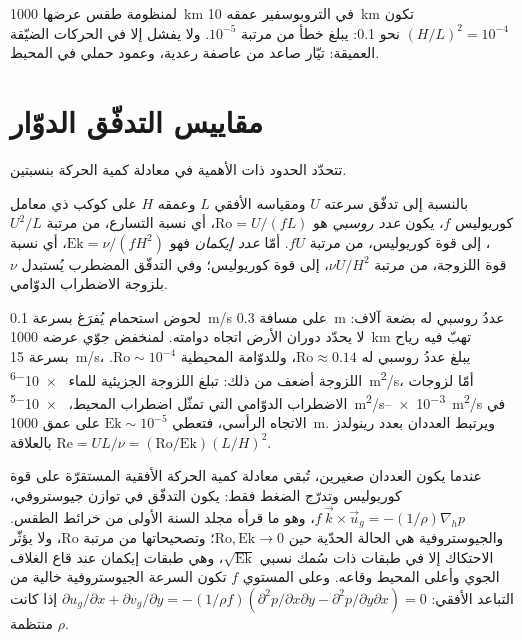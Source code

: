 لمنظومة طقس عرضها \qty{1000}{km} في التروبوسفير عمقه \qty{10}{km}
تكون $(H/L)^2 = 10^{-4}$  نحو 0.1: يبلغ
خطأ  من مرتبة $10^{-5}$. ولا يفشل إلا في الحركات الضيّقة العميقة:
تيّار صاعد من عاصفة رعدية، وعمود حملي في المحيط.

\section{مقاييس التدفّق الدوّار}\label{sec:b3:gfd-foundations:scales}

تتحدّد الحدود ذات الأهمية في معادلة كمية الحركة بنسبتين.

\begin{definition}\label{def:b3:gfd-foundations:numbers}
بالنسبة إلى تدفّق سرعته $U$ ومقياسه الأفقي $L$ وعمقه $H$ على كوكب ذي
معامل كوريوليس $f$، يكون \emph{عدد روسبي} هو
$\mathrm{Ro} = U/(fL)$، أي نسبة التسارع، من مرتبة $U^2/L$،
إلى قوة كوريوليس، من مرتبة $fU$. أمّا \emph{عدد إيكمان}
فهو $\mathrm{Ek} = \nu/(fH^2)$، أي نسبة
قوة اللزوجة، من مرتبة $\nu U/H^2$، إلى قوة كوريوليس؛ وفي
التدفّق المضطرب يُستبدل $\nu$ بلزوجة الاضطراب الدوّامي.
\end{definition}

لحوض استحمام يُفرَغ بسرعة \qty{0.1}{m/s} على مسافة \qty{0.3}{m} عددُ روسبي له
بضعة آلاف: لا يحدّد دوران الأرض اتجاه دوامته.
لمنخفض جوّي عرضه \qty{1000}{km} تهبّ فيه رياح بسرعة \qty{15}{m/s}،
يبلغ عددُ روسبي له $\mathrm{Ro} \approx 0.14$، وللدوّامة المحيطية $\mathrm{Ro} \sim 10^{-4}$.
اللزوجة أضعف من ذلك: تبلغ اللزوجة الجزيئية للماء
\qty{e-6}{m^2/s}، أمّا لزوجات الاضطراب الدوّامي التي تمثّل
اضطراب المحيط، \qtyrange{e-5}{e-3}{m^2/s} في الاتجاه الرأسي، فتعطي
$\mathrm{Ek} \sim 10^{-5}$ على عمق \qty{1000}{m}. ويرتبط العددان
بعدد رينولدز بالعلاقة $\mathrm{Re} = UL/\nu =
(\mathrm{Ro}/\mathrm{Ek})(L/H)^2$.

عندما يكون العددان صغيرين، تُبقي معادلة كمية الحركة الأفقية المستقرّة
على قوة كوريوليس وتدرّج الضغط فقط: يكون التدفّق في
توازن جيوستروفي، $f\,\vec k\times\vec u_g = -(1/\rho)\nabla_h p$، وهو
ما قرأه مجلد السنة الأولى من خرائط الطقس. والجيوستروفية هي الحالة الحدّية
حين $\mathrm{Ro}, \mathrm{Ek}\to 0$؛ وتصحيحاتها من مرتبة
$\mathrm{Ro}$، ولا يؤثّر الاحتكاك إلا في طبقات ذات سُمك نسبي
$\sqrt{\mathrm{Ek}}$، وهي طبقات إيكمان عند قاع الغلاف الجوي
وأعلى المحيط وقاعه. وعلى المستوي $f$ تكون السرعة الجيوستروفية
خالية من التباعد الأفقي: $\partial u_g/\partial x + \partial
v_g/\partial y = -(1/\rho f)(\partial^2 p/\partial x\partial y -
\partial^2 p/\partial y\partial x) = 0$ إذا كانت $\rho$ منتظمة.

